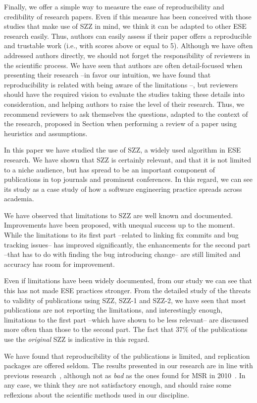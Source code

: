 \documentclass[a4paper, 12pt]{book}
\begin{document}
Finally, we offer a simple way to measure the ease of reproducibility and credibility of research papers. Even if this measure has been conceived with those studies that make use of SZZ in mind, we think it can be adapted to other ESE research easily. Thus, authors can easily assess if their paper offers a reproducible and trustable work (i.e., with scores above or equal to 5). Although we have often addressed authors directly, we should not forget the responsibility of reviewers in the scientific process. We have seen that authors are often detail-focused when presenting their research --in favor our intuition, we have found that reproducibility is related with being aware of the limitations --, but reviewers should have the required vision to evaluate the studies taking these details into consideration, and helping authors to raise the level of their research. Thus, we recommend reviewers to ask themselves the questions, adapted to the context of the research, proposed in Section when performing a review of a paper using heuristics and assumptions.

In this paper we have studied the use of SZZ, a widely used algorithm in ESE research. We have shown that SZZ is certainly relevant, and that it is not limited to a niche audience, but has spread to be an important component of publications in top journals and prominent conferences. In this regard, we can see its study as a case study of how a software engineering practice spreads across academia.

We have observed that limitations to SZZ are well known and documented. Improvements have been proposed, with unequal success up to the moment. While the limitations to its first part --related to linking fix commits and bug tracking issues-- has improved significantly, the enhancements for the second part --that has to do with finding the bug introducing change-- are still limited and accuracy has room for improvement.

Even if limitations have been widely documented, from our study we can see that this has not made ESE practices stronger. From the detailed study of the threats to validity of publications using SZZ, SZZ-1 and SZZ-2, we have seen that most publications are not reporting the limitations, and interestingly enough, limitations to the first part --which have shown to be less relevant-- are discussed more often than those to the second part. The fact that 37\% of the publications use the \emph{original} SZZ is indicative in this regard.

We have found that reproducibility of the publications is limited, and replication packages are offered seldom. The results presented in our research are in line with previous research~\cite{amann2015software}, although not as \emph{bad} as the ones found for MSR in 2010~\cite{robles2010replicating}. In any case, we think they are not satisfactory enough, and should raise some reflexions about the scientific methods used in our discipline.
\end{document}
